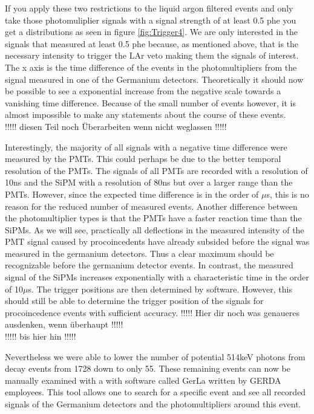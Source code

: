 If you apply these two restrictions to the liquid argon filtered events and only take those photomuliplier signals with a signal strength of at least 0.5 phe you get a distributions as seen in figure \ref{fig:Trigger4}.
We are only interested in the signals that measured at least 0.5 phe because, as mentioned above, that is the necessary intensity to trigger the LAr veto making them the signals of interest. 
The x axis is the time difference of the events in the photomultipliers from the signal measured in one of the Germanium detectors.
Theoretically it should now be possible to see a exponential increase from the negative scale towards a vanishing time difference.
Because of the small number of events however, it is almost impossible to make any statements about the course of these events.
\\

!!!!! diesen Teil noch Überarbeiten wenn nicht weglassen !!!!!

Interestingly, the majority of all signals with a negative time difference were measured by the PMTs. 
This could perhaps be due to the better temporal resolution of the PMTs. 
The signals of all PMTs are recorded with a resolution of 10ns and the SiPM with a resolution of 80ns but over a larger range than the PMTs\cite{nature}. 
However, since the expected time difference is in the order of \(\mu\)s, this is no reason for the reduced number of measured events. 
Another difference between the photomultiplier types is that the PMTs have a faster reaction time than the SiPMs. 
As we will see, practically all deflections in the measured intensity of the PMT signal caused by procoincedents have already subsided before the signal was measured in the germanium detectors. 
Thus a clear maximum should be recognizable before the germanium detector events.
In contrast, the measured signal of the SiPMs increases exponentially with a characteristic time in the order of 10\(\mu\)s. 
The trigger positions are then determined by software. 
However, this should still be able to determine the trigger position of the signals for procoincedence events with sufficient accuracy.
!!!!! Hier dir noch was genaueres ausdenken, wenn überhaupt !!!!!
\\

!!!!! bis hier hin !!!!!

Nevertheless we were able to lower the number of potential 514keV photons from \Kr decay events from 1728 down to only 55.  
These remaining events can now be manually examined with a with software called GerLa written by GERDA employees.
This tool allows one to search for a specific event and see all recorded signals of the Germanium detectors and the photomultipliers around this event.
\\

